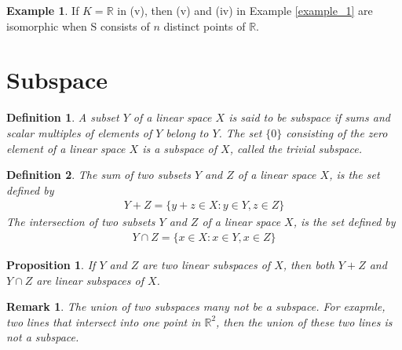 \documentclass[11pt]{book}
\newtheorem{definition}{Definition}[section]
\newtheorem{proposition}{Proposition}[section]
\newtheorem{remark}{Remark}[section]
\theoremstyle{definition}
\newtheorem{example}{Example}[section]
\numberwithin{equation}{chapter}
\begin{document}
\medskip

\begin{example}
If $K=\mathbb{R}$ in (v), then (v) and (iv) in Example \ref{example_1} are isomorphic when S
consists of $n$ distinct points of $\mathbb{R}$.
\end{example}

\medskip

\section{Subspace}
\begin{definition}
A subset $Y$ of a linear space $X$ is said to be subspace if sums and scalar multiples of elements of $Y$ belong to $Y$. The set $\{0\}$ consisting of the zero element of a linear space $X$ is a subspace of $X$, called the trivial subspace.
\end{definition}

\medskip

\begin{definition}
The sum of two subsets $Y$ and $Z$ of a linear space $X$, is the set defined by 
\begin{align*}
    Y+Z = \{y+z\in X: y\in Y, z\in Z\}
\end{align*}
The intersection of two subsets $Y$ and $Z$ of a linear space $X$, is the set defined by
\begin{align*}
    Y\cap Z = \{x\in X: x\in Y, x\in Z\}
\end{align*}
\end{definition}

\medskip

\begin{proposition}
If $Y$ and $Z$ are two linear subspaces of $X$, then both $Y+Z$ and $Y\cap Z$ are linear subspaces of $X$.
\end{proposition}
\begin{remark}
The union of two subspaces many not be a subspace. For exapmle, two lines that intersect into one point in $\mathbb{R}^2$, then the union of these two lines is not a subspace.
\end{remark}

\medskip
\end{document}
